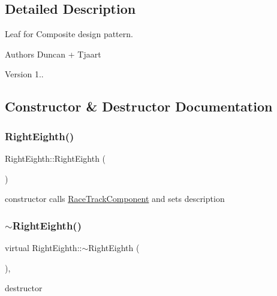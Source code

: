 \subsection{Detailed Description}
Leaf for Composite design pattern. 

\begin{DoxyAuthor}{Authors}
Duncan + Tjaart 
\end{DoxyAuthor}
\begin{DoxyVersion}{Version}
1.. 
\end{DoxyVersion}


\subsection{Constructor \& Destructor Documentation}
\mbox{\label{class_right_eighth_add9aa8a804f6e7f418028722b742381b}} 
\subsubsection{\texorpdfstring{Right\+Eighth()}{RightEighth()}}
{\footnotesize\ttfamily Right\+Eighth\+::\+Right\+Eighth (\begin{DoxyParamCaption}{ }\end{DoxyParamCaption})\hspace{0.3cm}{\ttfamily [inline]}}

constructor calls \mbox{\hyperlink{class_race_track_component}{Race\+Track\+Component}} and sets description \mbox{\label{class_right_eighth_a91f2bfcc307de2c48ab18ed1809226ff}} 
\subsubsection{\texorpdfstring{$\sim$\+Right\+Eighth()}{~RightEighth()}}
{\footnotesize\ttfamily virtual Right\+Eighth\+::$\sim$\+Right\+Eighth (\begin{DoxyParamCaption}{ }\end{DoxyParamCaption})\hspace{0.3cm}{\ttfamily [inline]}, {\ttfamily [virtual]}}

destructor 

